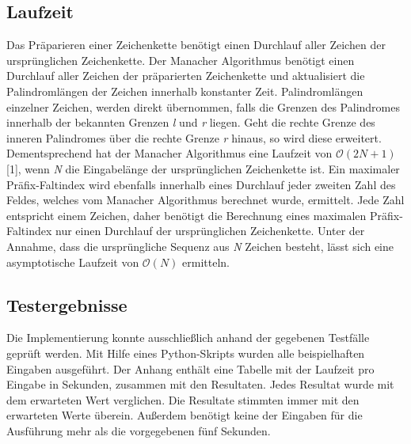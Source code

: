 \subsection{Laufzeit}
\label{subsec:TextBefehle}
Das Präparieren einer Zeichenkette benötigt einen Durchlauf aller Zeichen der ursprünglichen Zeichenkette. Der Manacher Algorithmus benötigt einen Durchlauf aller Zeichen der präparierten Zeichenkette und aktualisiert die Palindromlängen der Zeichen innerhalb konstanter Zeit. Palindromlängen einzelner Zeichen, werden direkt übernommen, falls die Grenzen des Palindromes innerhalb der bekannten Grenzen \textit{l} und \textit{r} liegen. Geht die rechte Grenze des inneren Palindromes über die rechte Grenze \textit{r} hinaus, so wird diese erweitert. Dementsprechend hat der Manacher Algorithmus eine Laufzeit von $\mathcal{O}(2N+1)$ [1], wenn \textit{N} die Eingabelänge der ursprünglichen Zeichenkette ist. Ein maximaler Präfix-Faltindex wird ebenfalls innerhalb eines Durchlauf jeder zweiten Zahl des Feldes, welches vom Manacher Algorithmus berechnet wurde, ermittelt. Jede Zahl entspricht einem Zeichen, daher benötigt die Berechnung eines maximalen Präfix-Faltindex nur einen Durchlauf der ursprünglichen Zeichenkette. Unter der Annahme, dass die ursprüngliche Sequenz aus \textit{N} Zeichen besteht, lässt sich eine asymptotische Laufzeit von $\mathcal{O}(N)$ ermitteln.
%
\subsection{Testergebnisse}
\label{subsec:TextBefehle}
Die Implementierung konnte ausschließlich anhand der gegebenen Testfälle geprüft werden. Mit Hilfe eines Python-Skripts wurden alle beispielhaften Eingaben ausgeführt. Der Anhang enthält eine Tabelle mit der Laufzeit pro Eingabe in Sekunden, zusammen mit den Resultaten. Jedes Resultat wurde mit dem erwarteten Wert verglichen. Die Resultate stimmten immer mit den erwarteten Werte überein. Außerdem benötigt keine der Eingaben für die Ausführung mehr als die vorgegebenen fünf Sekunden.
%